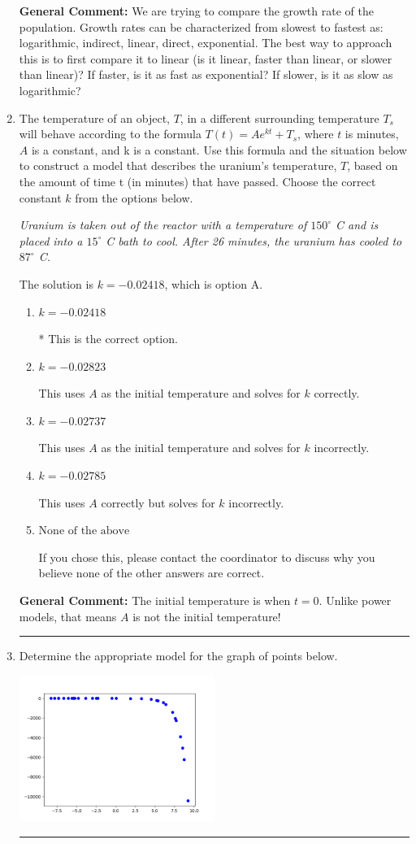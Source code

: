 \documentclass{extbook}[14pt]
\newcommand{\litem}[1]{\item #1

\rule{\textwidth}{0.4pt}}
\begin{document}
\begin{enumerate}
{\textbf{General Comment:} We are trying to compare the growth rate of the population. Growth rates can be characterized from slowest to fastest as: logarithmic, indirect, linear, direct, exponential. The best way to approach this is to first compare it to linear (is it linear, faster than linear, or slower than linear)? If faster, is it as fast as exponential? If slower, is it as slow as logarithmic?
}
\litem{
The temperature of an object, $T$, in a different surrounding temperature $T_s$ will behave according to the formula $T(t) = Ae^{kt} + T_s$, where $t$ is minutes, $A$ is a constant, and k is a constant. Use this formula and the situation below to construct a model that describes the uranium's temperature, $T$, based on the amount of time t (in minutes) that have passed. Choose the correct constant $k$ from the options below.

\begin{center}
    \textit{ Uranium is taken out of the reactor with a temperature of $150^{\circ}$ C and is placed into a $15^{\circ}$ C bath to cool. After 26 minutes, the uranium has cooled to $87^{\circ}$ C. }
\end{center}
The solution is \( k = -0.02418 \), which is option A.\begin{enumerate}[label=\Alph*.]
\item \( k = -0.02418 \)

* This is the correct option.
\item \( k = -0.02823 \)

This uses $A$ as the initial temperature and solves for $k$ correctly.
\item \( k = -0.02737 \)

This uses $A$ as the initial temperature and solves for $k$ incorrectly.
\item \( k = -0.02785 \)

This uses $A$ correctly but solves for $k$ incorrectly.
\item \( \text{None of the above} \)

If you chose this, please contact the coordinator to discuss why you believe none of the other answers are correct.
\end{enumerate}

\textbf{General Comment:} The initial temperature is when $t = 0$. Unlike power models, that means $A$ is not the initial temperature!
}
\litem{
Determine the appropriate model for the graph of points below.

\begin{center}
    \includegraphics[width=0.5\textwidth]{../Figures/identifyModelGraph11B.png}
\end{center}


}
\end{enumerate}
\end{document}
